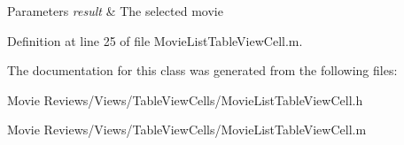 \begin{DoxyParams}{Parameters}
{\em result} & The selected movie \\
\hline
\end{DoxyParams}


Definition at line 25 of file Movie\+List\+Table\+View\+Cell.\+m.



The documentation for this class was generated from the following files\+:\begin{DoxyCompactItemize}
\item 
Movie Reviews/\+Views/\+Table\+View\+Cells/Movie\+List\+Table\+View\+Cell.\+h\item 
Movie Reviews/\+Views/\+Table\+View\+Cells/Movie\+List\+Table\+View\+Cell.\+m\end{DoxyCompactItemize}
